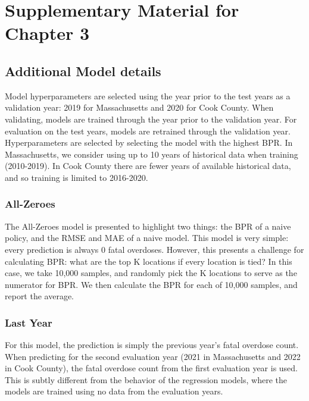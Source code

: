 \section{Supplementary Material for Chapter 3}\label{supplementary-material}

\subsection{Additional Model details}\label{additional-model-details}

Model hyperparameters are selected using the year prior to the test years as a validation year: 2019 for Massachusetts and 2020 for Cook County. When validating, models are trained through the year prior to the validation year. For evaluation on the test years, models are retrained through the validation year. Hyperparameters are selected by selecting the model with the highest BPR. In Massachusetts, we consider using up to 10 years of historical data when training (2010-2019). In Cook County there are fewer years of available historical data, and so training is limited to 2016-2020.

\subsubsection{All-Zeroes}\label{all-zeroes}

The All-Zeroes model is presented to highlight two things: the BPR of a naive policy, and the RMSE and MAE of a naive model. This model is very simple: every prediction is always 0 fatal overdoses. However, this presents a challenge for calculating BPR: what are the top K locations if every location is tied? In this case, we take 10,000 samples, and randomly pick the K locations to serve as the numerator for BPR. We then calculate the BPR for each of 10,000 samples, and report the average.

\subsubsection{Last Year}\label{last-year}

For this model, the prediction is simply the previous year's fatal overdose count. When predicting for the second evaluation year (2021 in Massachusetts and 2022 in Cook County), the fatal overdose count from the first evaluation year is used. This is subtly different from the behavior of the regression models, where the models are trained using no data from the evaluation years.

